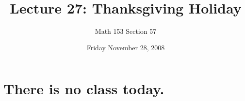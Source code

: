 \documentclass[12pt]{article}
\title{Lecture 27: Thanksgiving Holiday}
\author{Math 153 Section 57}
\date{Friday November 28, 2008}
\begin{document}
\maketitle

\section{There is no class today.}
\end{document}
